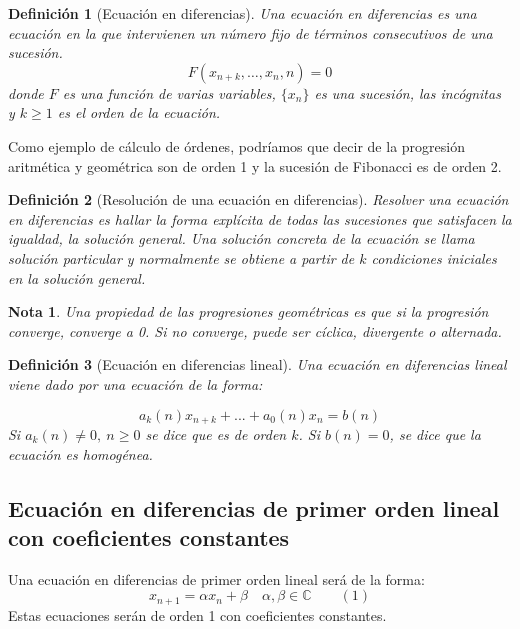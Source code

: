 \documentclass[11pt, a4paper]{article}
\newif\IfInSansMode
\numberwithin{equation}{section}
\theoremstyle{theorem-style}
\theoremstyle{definition-style}
\newtheorem{ndef}{Definición}[section]
\theoremstyle{remark-style}
\newtheorem*{nota}{Nota}
\theoremstyle{example-style}
\begin{document}
\begin{ndef}[Ecuación en diferencias]
	Una ecuación en diferencias es una ecuación en la que intervienen un número fijo de términos consecutivos de una sucesión.
	\[
	F(x_{n+k},\dots, x_n , n)= 0
	\]
donde $F$ es una función de varias variables, $\{x_n\}$ es una sucesión, las incógnitas y $k \geq 1 $ es el orden de la ecuación.
\end{ndef}

Como ejemplo de cálculo de órdenes, podríamos que decir de la progresión aritmética y geométrica son de orden 1 y la sucesión de Fibonacci es de orden 2.

\begin{ndef}[Resolución de una ecuación en diferencias]
	Resolver una ecuación en diferencias es hallar la forma explícita de todas las sucesiones que satisfacen la igualdad, la solución general. Una solución concreta de la ecuación se llama solución particular y normalmente se obtiene a partir de $k$ condiciones iniciales en la solución general.
\end{ndef}

\begin{nota}
	Una propiedad de las progresiones geométricas es que si la progresión converge, converge a 0. Si no converge, puede ser cíclica, divergente o alternada.
\end{nota}

\begin{ndef}[Ecuación en diferencias lineal]
	Una ecuación en diferencias lineal viene dado por una ecuación de la forma:

\[
a_k(n)x_{n+k} + ... + a_0(n)x_n = b(n)
\]
Si $a_k(n)\ne 0, \ n \geq 0$ se dice que es de orden $k$. Si $b(n) = 0$, se dice que la ecuación es homogénea.
\end{ndef}


\subsection[E.D. primer orden coef. const.]{Ecuación en diferencias de primer orden lineal con coeficientes constantes}

Una ecuación en diferencias de primer orden lineal será de la forma:
\[
x_{n+1} = \alpha x_n +  \beta \quad \alpha,\beta \in \mathbb{C}\quad \quad (1)
\]
Estas ecuaciones serán de orden 1 con coeficientes constantes.
\end{document}
